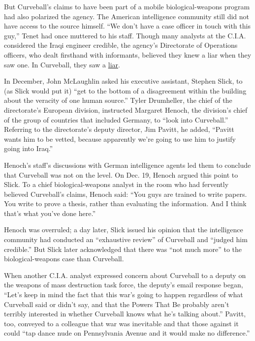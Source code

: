 But Curveball's claims to have been part of a mobile biological-weapons
program had also polarized the agency. The American intelligence
community still did not have access to the source himself. ``We don't
have a case officer in touch with this guy,'' Tenet had once muttered to
his staff. Though many analysts at the C.I.A. considered the Iraqi
engineer credible, the agency's Directorate of Operations officers, who
dealt firsthand with informants, believed they knew a liar when they saw
one. In Curveball, they saw a
\href{https://www.nytimes.com/2004/07/11/world/the-reach-of-war-conclusions-powell-s-solid-cia-tips-were-soft-committee-says.html}{liar}.

In December, John McLaughlin asked his executive assistant, Stephen
Slick, to (as Slick would put it) ``get to the bottom of a disagreement
within the building about the veracity of one human source.'' Tyler
Drumheller, the chief of the directorate's European division, instructed
Margaret Henoch, the division's chief of the group of countries that
included Germany, to ``look into Curveball.'' Referring to the
directorate's deputy director, Jim Pavitt, he added, ``Pavitt wants him
to be vetted, because apparently we're going to use him to justify going
into Iraq.''

Henoch's staff's discussions with German intelligence agents led them to
conclude that Curveball was not on the level. On Dec. 19, Henoch argued
this point to Slick. To a chief biological-weapons analyst in the room
who had fervently believed Curveball's claims, Henoch said: ``You guys
are trained to write papers. You write to prove a thesis, rather than
evaluating the information. And I think that's what you've done here.''

Henoch was overruled; a day later, Slick issued his opinion that the
intelligence community had conducted an ``exhaustive review'' of
Curveball and ``judged him credible.'' But Slick later acknowledged that
there was ``not much more'' to the biological-weapons case than
Curveball.

When another C.I.A. analyst expressed concern about Curveball to a
deputy on the weapons of mass destruction task force, the deputy's email
response began, ``Let's keep in mind the fact that this war's going to
happen regardless of what Curveball said or didn't say, and that the
Powers That Be probably aren't terribly interested in whether Curveball
knows what he's talking about.'' Pavitt, too, conveyed to a colleague
that war was inevitable and that those against it could ``tap dance nude
on Pennsylvania Avenue and it would make no difference.''

